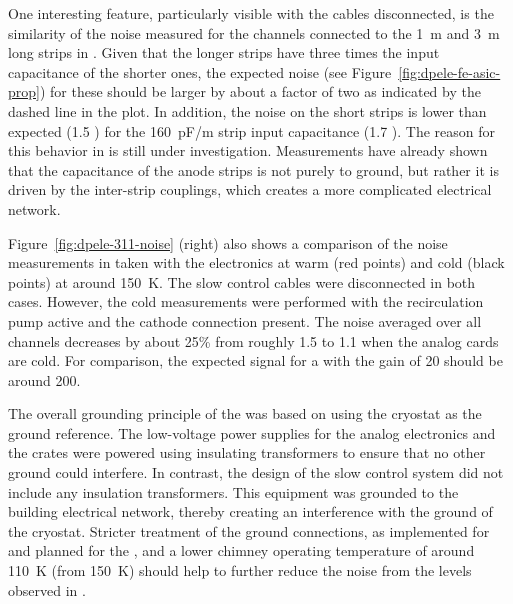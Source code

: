 One interesting feature, particularly visible with the cables disconnected, is %
the similarity of the noise measured for the channels connected to the \SI{1}{\meter} and \SI{3}{\meter} long strips in . 
Given that the longer strips have %
three times the input capacitance of the shorter ones, the expected noise (see Figure~\ref{fig:dpele-fe-asic-prop}) for these should be larger by about a factor of two as indicated by the dashed line in the plot. In addition, the noise on the short strips is lower than expected (\num{1.5} ) for the \SI{160}{pF/m} strip input capacitance (\num{1.7} ). The reason for this behavior %
in  is still under investigation. %
Measurements have already shown that the capacitance of the  anode strips is not purely to ground, but rather it is driven by the inter-strip couplings, which creates a more complicated electrical network. 

Figure~\ref{fig:dpele-311-noise} (right) also shows a comparison of the noise measurements in  taken with the  electronics at warm (red points) and cold (black points) at around \SI{150}{\kelvin}. The slow control cables were disconnected in both cases. However, the cold measurements were performed with the recirculation pump active and the cathode  connection present. 
The \rms noise averaged over all channels decreases by about 25\% from roughly \SI{1.5}{} to \SI{1.1}{} when the  analog cards are cold. For comparison, the expected signal for a  with the  gain of \num{20} should be around \SI{200}{}. 

The overall grounding principle of the  was based on %
using the cryostat as the ground reference. The low-voltage power supplies for the  analog electronics and the  crates were powered %
using insulating transformers to ensure that %
no other ground could interfere. %
In contrast, the design of the slow control system did not include any insulation transformers. This equipment was grounded to the building electrical network, thereby creating an interference with the ground of the cryostat. Stricter treatment of the ground connections, as %
implemented for  and planned for the , and a lower  chimney operating temperature of around \SI{110}{\kelvin} (from \SI{150}{\kelvin}) should help to further reduce the noise %
from the levels observed in .


